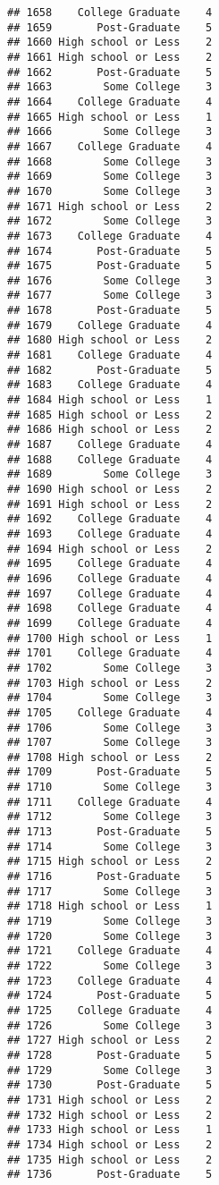 \documentclass[
]{article}
\begin{document}
\begin{verbatim}
## 1658    College Graduate    4
## 1659       Post-Graduate    5
## 1660 High school or Less    2
## 1661 High school or Less    2
## 1662       Post-Graduate    5
## 1663        Some College    3
## 1664    College Graduate    4
## 1665 High school or Less    1
## 1666        Some College    3
## 1667    College Graduate    4
## 1668        Some College    3
## 1669        Some College    3
## 1670        Some College    3
## 1671 High school or Less    2
## 1672        Some College    3
## 1673    College Graduate    4
## 1674       Post-Graduate    5
## 1675       Post-Graduate    5
## 1676        Some College    3
## 1677        Some College    3
## 1678       Post-Graduate    5
## 1679    College Graduate    4
## 1680 High school or Less    2
## 1681    College Graduate    4
## 1682       Post-Graduate    5
## 1683    College Graduate    4
## 1684 High school or Less    1
## 1685 High school or Less    2
## 1686 High school or Less    2
## 1687    College Graduate    4
## 1688    College Graduate    4
## 1689        Some College    3
## 1690 High school or Less    2
## 1691 High school or Less    2
## 1692    College Graduate    4
## 1693    College Graduate    4
## 1694 High school or Less    2
## 1695    College Graduate    4
## 1696    College Graduate    4
## 1697    College Graduate    4
## 1698    College Graduate    4
## 1699    College Graduate    4
## 1700 High school or Less    1
## 1701    College Graduate    4
## 1702        Some College    3
## 1703 High school or Less    2
## 1704        Some College    3
## 1705    College Graduate    4
## 1706        Some College    3
## 1707        Some College    3
## 1708 High school or Less    2
## 1709       Post-Graduate    5
## 1710        Some College    3
## 1711    College Graduate    4
## 1712        Some College    3
## 1713       Post-Graduate    5
## 1714        Some College    3
## 1715 High school or Less    2
## 1716       Post-Graduate    5
## 1717        Some College    3
## 1718 High school or Less    1
## 1719        Some College    3
## 1720        Some College    3
## 1721    College Graduate    4
## 1722        Some College    3
## 1723    College Graduate    4
## 1724       Post-Graduate    5
## 1725    College Graduate    4
## 1726        Some College    3
## 1727 High school or Less    2
## 1728       Post-Graduate    5
## 1729        Some College    3
## 1730       Post-Graduate    5
## 1731 High school or Less    2
## 1732 High school or Less    2
## 1733 High school or Less    1
## 1734 High school or Less    2
## 1735 High school or Less    2
## 1736       Post-Graduate    5

\end{verbatim}
\end{document}
